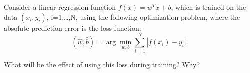 Consider a linear regression function \(f(x)=w^Tx+b\), which is trained on the data \((x_i,y_i)\), i=1,…,N, using the following optimization problem, where the absolute prediction error is the loss function:
\[
(\hat w,\hat b)=\arg\min_{w,b}\sum_{i=1}^N|f(x_i)-y_i|.
\]


What will be the effect of using this loss during training? Why?
